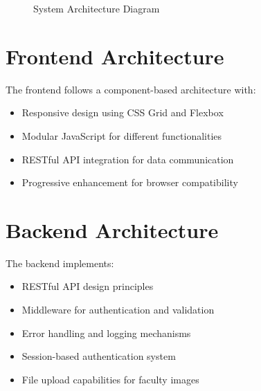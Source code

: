 \documentclass[12pt,a4paper]{report}
\begin{document}
\begin{figure}[h]
    \centering
    \caption{System Architecture Diagram}
    \label{fig:architecture}
\end{figure}

\section{Frontend Architecture}
The frontend follows a component-based architecture with:
\begin{itemize}
    \item Responsive design using CSS Grid and Flexbox
    \item Modular JavaScript for different functionalities
    \item RESTful API integration for data communication
    \item Progressive enhancement for browser compatibility
\end{itemize}

\section{Backend Architecture}
The backend implements:
\begin{itemize}
    \item RESTful API design principles
    \item Middleware for authentication and validation
    \item Error handling and logging mechanisms
    \item Session-based authentication system
    \item File upload capabilities for faculty images
\end{itemize}
\end{document}
